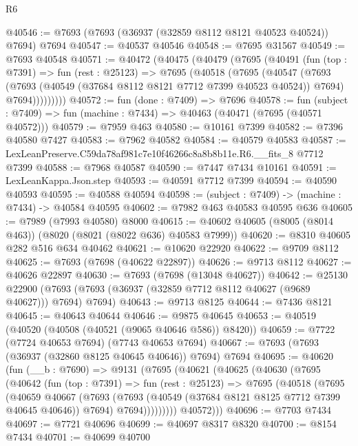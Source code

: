 \begin{lexlean}{R6}
\begin{coremodule}
@40546 := @7693 (@7693 (@36937 (@32859 @8112 @8121 @40523 @40524)) @7694) @7694
@40547 := @40537 @40546
@40548 := @7695 @31567
@40549 := @7693 @40548
@40571 := @40472
    (@40475
      (@40479
        (@7695
          (@40491
            (fun (top : @7391) =>
            fun (rest : @25123) =>
            @7695
              (@40518
                (@7695
                  (@40547
                    (@7693
                      (@7693 (@40549 (@37684 @8112 @8121 @7712 @7399 @40523 @40524)) @7694)
                      @7694)))))))))
@40572 := fun (done : @7409) => @7696
@40578 := fun (subject : @7409) => fun (machine : @7434) => @40463 (@40471 (@7695 (@40571 @40572)))
@40579 := @7959 @463
@40580 := @10161 @7399
@40582 := @7396 @40580 @7427
@40583 := @7962 @40582
@40584 := @40579 @40583
@40587 := LexLeanPreserve.C59da78af981c7e10f46266c8a8b8b11e.R6.__fits_8 @7712 @7399
@40588 := @7968 @40587
@40590 := @7447 @7434 @10161
@40591 := LexLeanKappa.Json.step
@40593 := @40591 @7712 @7399
@40594 := @40590 @40593
@40595 := @40588 @40594
@40598 := (subject : @7409) -> (machine : @7434) -> @40584 @40595
@40602 := @7982 @463 @40583 @40595 @636
@40605 := @7989 (@7993 @40580) @8000
@40615 := @40602 @40605 (@8005 (@8014 @463)) (@8020 (@8021 (@8022 @636) @40583 @7999))
@40620 := @8310 @40605 @282 @516 @634 @40462
@40621 := @10620 @22920
@40622 := @9709 @8112
@40625 := @7693 (@7698 (@40622 @22897))
@40626 := @9713 @8112
@40627 := @40626 @22897
@40630 := @7693 (@7698 (@13048 @40627))
@40642 := @25130
    @22900
    (@7693 (@7693 (@36937 (@32859 @7712 @8112 @40627 (@9689 @40627))) @7694) @7694)
@40643 := @9713 @8125
@40644 := @7436 @8121
@40645 := @40643 @40644
@40646 := @9875 @40645
@40653 := @40519 (@40520 (@40508 (@40521 (@9065 @40646 @586)) @8420))
@40659 := @7722 (@7724 @40653 @7694) (@7743 @40653 @7694)
@40667 := @7693 (@7693 (@36937 (@32860 @8125 @40645 @40646)) @7694) @7694
@40695 := @40620
    (fun (__b : @7690) =>
    @9131
      (@7695
        (@40621
          (@40625
            (@40630
              (@7695
                (@40642
                  (fun (top : @7391) =>
                  fun (rest : @25123) =>
                  @7695
                    (@40518
                      (@7695
                        (@40659
                          @40667
                          (@7693
                            (@7693 (@40549 (@37684 @8121 @8125 @7712 @7399 @40645 @40646)) @7694)
                            @7694)))))))))
          @40572)))
@40696 := @7703 @7434
@40697 := @7721 @40696
@40699 := @40697 @8317 @8320
@40700 := @8154 @7434
@40701 := @40699 @40700

\end{coremodule}
\end{lexlean}
